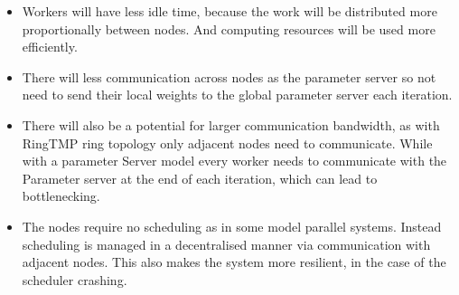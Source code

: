 \begin{itemize}

    \item Workers will have less idle time, because the work will be distributed
    more proportionally between nodes. And computing resources will be used more
    efficiently.
    \item There will less communication across nodes as the parameter server so
    not need to send their local weights to the global parameter server each
    iteration.
    \item There will also be a potential for larger communication bandwidth, as
    with RingTMP ring topology only adjacent nodes need to communicate. While
    with a parameter Server model every worker needs to communicate with the
    Parameter server at the end of each iteration, which can lead to
    bottlenecking.
    \item The nodes require no scheduling as in some model parallel systems.
    Instead scheduling is managed in a decentralised manner via communication
    with adjacent nodes. This also makes the system more resilient, in the case
    of the scheduler crashing.
\end{itemize}

